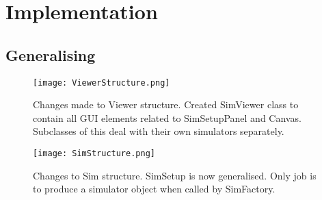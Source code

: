\chapter{Implementation}
\label{cha:Implementation}

\section{Generalising}
\label{sec:Generalising}

\begin{figure}[h]
\texttt{[image: ViewerStructure.png]}
\caption{Changes made to Viewer structure. Created SimViewer class to contain all GUI elements related to SimSetupPanel and Canvas. Subclasses of this deal with their own simulators separately.}
\end{figure}

\begin{figure}[h]
\texttt{[image: SimStructure.png]}
\caption{Changes to Sim structure. SimSetup is now generalised. Only job is to produce a simulator object when called by SimFactory.}
\end{figure}